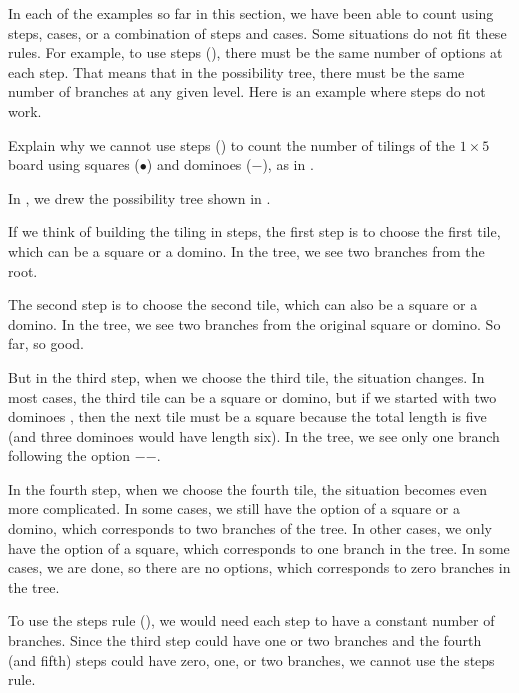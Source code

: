 In each of the examples so far in this section, we have been able to count using steps, cases, or a combination of steps and cases. Some situations do not fit these rules. 
For example, to use steps (), there must be the same number of options at each step.  That means that in the possibility tree, there must be the same number of branches at any given level. Here is an example where steps do not work.

\begin{exam} 
\label{exam_not_steps}
    Explain why we cannot use steps () to count the number of tilings of the $1 \times 5$ board using squares ($\bullet$) and dominoes ($\boldsymbol{-}$), as in .
    \begin{soln}
        In , we drew the possibility tree shown in .  
        
        If we think of building the tiling in steps, the first step is to choose the first tile, which can be a square or a domino.  In the tree, we see two branches from the root.  
    
        The second step is to choose the second tile, which can also be a square or a domino.  In the tree, we see two branches from the original square or domino.  So far, so good.
    
        But in the third step, when we choose the third tile, the situation changes.  In most cases, the third tile can be a square or domino, but if we started with two dominoes , then the next tile must be a square because the total length is five (and three dominoes would have length six).  In the tree, we see only one branch following the option $\boldsymbol{-}\boldsymbol{-}$.  
    
        In the fourth step, when we choose the fourth tile, the situation becomes even more complicated. In some cases, we still have the option of a square or a domino, which corresponds to two branches of the tree.  In other cases, we only have the option of a square, which corresponds to one branch in the tree. In some cases, we are done, so there are no options, which corresponds to zero branches in the tree.

        To use the steps rule (), we would need each step to have a constant number of branches.  Since the third step could have one or two branches and the fourth (and fifth) steps could have zero, one, or two branches, we cannot use the steps rule.
    \end{soln}
\end{exam}

